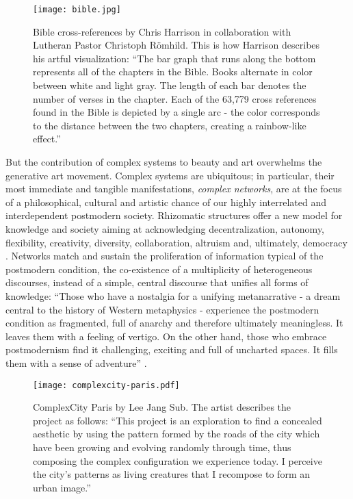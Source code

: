 \documentclass{article}
\begin{document}
\begin{figure}[t]
\centering
\texttt{[image: bible.jpg]}
\caption{Bible cross-references by Chris Harrison in collaboration with Lutheran Pastor Christoph R\"{o}mhild. This is how Harrison describes his artful visualization: ``The bar graph that runs along the bottom represents all of the chapters in the Bible. Books alternate in color between white and light gray. The length of each bar denotes the number of verses in the chapter. Each of the 63,779 cross references found in the Bible is depicted by a single arc - the color corresponds to the distance between the two chapters, creating a rainbow-like effect.'' \cite{CH14}}
\label{bible}
\end{figure}




But the contribution of complex systems to beauty and art overwhelms the generative art movement. Complex systems are ubiquitous; in particular, their most immediate and tangible manifestations, \textit{complex networks}, are at the focus of a philosophical, cultural and artistic chance of our highly interrelated and interdependent postmodern society. Rhizomatic structures offer a new model for knowledge and society aiming at acknowledging decentralization, autonomy, flexibility, creativity, diversity, collaboration, altruism and, ultimately, democracy \cite{DG80,L11,LHN05}. Networks match and sustain the proliferation of information typical of the postmodern condition, the co-existence of a multiplicity of heterogeneous discourses, instead of a simple, central discourse that unifies all forms of knowledge: ``Those who have a nostalgia for a unifying metanarrative - a dream central to the history of Western metaphysics - experience the postmodern condition as fragmented, full of anarchy and therefore ultimately meaningless. It leaves them with a feeling of vertigo. On the other hand, those who embrace postmodernism find it challenging, exciting and full of uncharted spaces. It fills them with a sense of adventure'' \cite{L84,C98}.  

\begin{figure}[t]
\centering
\texttt{[image: complexcity-paris.pdf]}
\caption{ComplexCity Paris by Lee Jang Sub. The artist describes the project as follows: ``This project is an exploration to find a concealed aesthetic by using the pattern formed by the roads of the city which have been growing and evolving randomly through time, thus composing the complex configuration we experience today. I perceive the city's patterns as living creatures that I recompose to form an urban image.'' \cite{LJS14} }
\label{city}
\end{figure}
\end{document}
